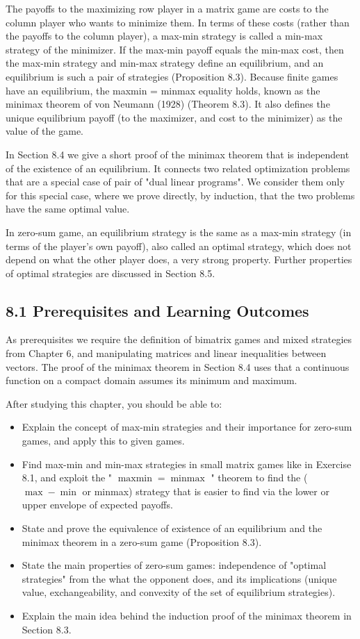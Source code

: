 \documentclass[12pt]{article}
\begin{document}
The payoffs to the maximizing row player in a matrix game are costs to the column player who wants to minimize them. In terms of these costs (rather than the payoffs to the column player), a max-min strategy is called a min-max strategy of the minimizer. If the max-min payoff equals the min-max cost, then the max-min strategy and min-max strategy define an equilibrium, and an equilibrium is such a pair of strategies (Proposition 8.3). Because finite games have an equilibrium, the maxmin = minmax equality holds, known as the minimax theorem of von Neumann (1928) (Theorem 8.3). It also defines the unique equilibrium payoff (to the maximizer, and cost to the minimizer) as the value of the game.

In Section 8.4 we give a short proof of the minimax theorem that is independent of the existence of an equilibrium. It connects two related optimization problems that are a special case of pair of "dual linear programs". We consider them only for this special case, where we prove directly, by induction, that the two problems have the same optimal value.

In zero-sum game, an equilibrium strategy is the same as a max-min strategy (in terms of the player's own payoff), also called an optimal strategy, which does not depend on what the other player does, a very strong property. Further properties of optimal strategies are discussed in Section 8.5.

\subsection*{8.1 Prerequisites and Learning Outcomes}
As prerequisites we require the definition of bimatrix games and mixed strategies from Chapter 6, and manipulating matrices and linear inequalities between vectors. The proof of the minimax theorem in Section 8.4 uses that a continuous function on a compact domain assumes its minimum and maximum.

After studying this chapter, you should be able to:

\begin{itemize}
  \item Explain the concept of max-min strategies and their importance for zero-sum games, and apply this to given games.
  \item Find max-min and min-max strategies in small matrix games like in Exercise 8.1, and exploit the " $\operatorname{maxmin}=\operatorname{minmax}$ " theorem to find the ( $\max -\min$ or minmax) strategy that is easier to find via the lower or upper envelope of expected payoffs.
  \item State and prove the equivalence of existence of an equilibrium and the minimax theorem in a zero-sum game (Proposition 8.3).
  \item State the main properties of zero-sum games: independence of "optimal strategies" from the what the opponent does, and its implications (unique value, exchangeability, and convexity of the set of equilibrium strategies).
  \item Explain the main idea behind the induction proof of the minimax theorem in Section 8.3.
\end{itemize}
\end{document}
